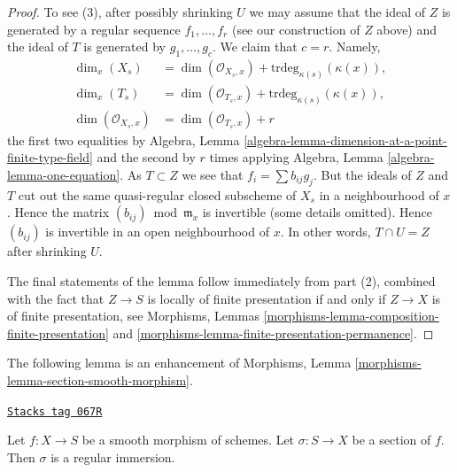 \begin{proof}
\medskip\noindent
To see (3), after possibly shrinking $U$ we may assume that
the ideal of $Z$ is generated by a regular sequence $f_1, \ldots, f_r$
(see our construction of $Z$ above)
and the ideal of $T$ is generated by $g_1, \ldots, g_c$.
We claim that $c = r$. Namely,
\begin{align*}
\dim_x(X_s) & = \dim(\mathcal{O}_{X_s, x}) +
\text{trdeg}_{\kappa(s)}(\kappa(x)), \\
\dim_x(T_s) & = \dim(\mathcal{O}_{T_s, x}) +
\text{trdeg}_{\kappa(s)}(\kappa(x)), \\
\dim(\mathcal{O}_{X_s, x}) & = \dim(\mathcal{O}_{T_s, x}) + r
\end{align*}
the first two equalities by
Algebra, Lemma \ref{algebra-lemma-dimension-at-a-point-finite-type-field}
and the second by $r$ times applying
Algebra, Lemma \ref{algebra-lemma-one-equation}.
As $T \subset Z$ we see that
$f_i = \sum b_{ij} g_j$. But the ideals of $Z$ and $T$ cut out the same
quasi-regular closed subscheme of $X_s$ in a neighbourhood of $x$. Hence
the matrix $(b_{ij}) \bmod \mathfrak m_x$ is invertible (some details
omitted). Hence $(b_{ij})$ is invertible in an
open neighbourhood of $x$. In other words,
$T \cap U = Z$ after shrinking $U$.

\medskip\noindent
The final statements of the lemma follow immediately from
part (2), combined with the fact that $Z \to S$
is locally of finite presentation if and only if $Z \to X$ is
of finite presentation, see
Morphisms, Lemmas \ref{morphisms-lemma-composition-finite-presentation} and
\ref{morphisms-lemma-finite-presentation-permanence}.
\end{proof}

The following lemma is an enhancement of
Morphisms, Lemma \ref{morphisms-lemma-section-smooth-morphism}.

\begin{lemma}
\label{divisors-lemma-section-smooth-regular-immersion}
\href{https://stacks.math.columbia.edu/tag/067R}{\texttt{Stacks tag 067R}}

Let $f : X \to S$ be a smooth morphism of schemes.
Let $\sigma : S \to X$ be a section of $f$.
Then $\sigma$ is a regular immersion.
\end{lemma}

